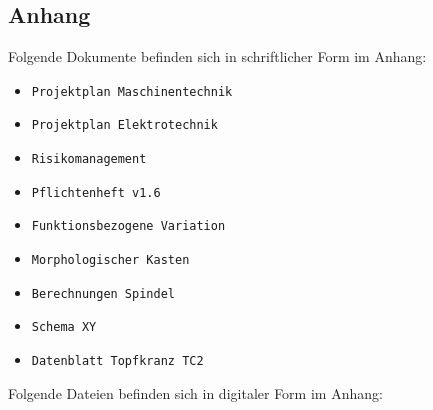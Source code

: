 \newpage
\begin{appendix}
\section{Anhang}
Folgende Dokumente befinden sich in schriftlicher Form im Anhang:

\begin{itemize}
	\item \verb|Projektplan Maschinentechnik|
	\item \verb|Projektplan Elektrotechnik|	
	\item \verb|Risikomanagement|
	\item \verb|Pflichtenheft v1.6|	
	\item \verb|Funktionsbezogene Variation|
	\item \verb|Morphologischer Kasten|	
	\item \verb|Berechnungen Spindel|
	\item \verb|Schema XY|
	\item \verb|Datenblatt Topfkranz TC2|	
\end{itemize}

Folgende Dateien befinden sich in digitaler Form im Anhang:


\end{appendix}
